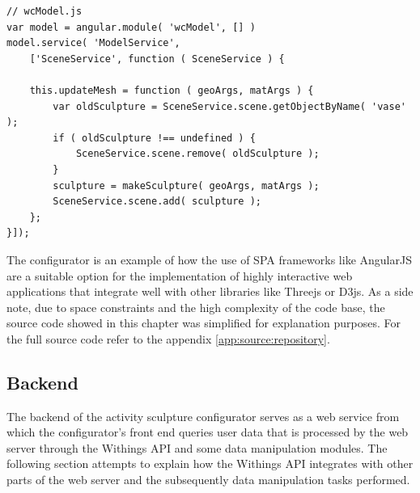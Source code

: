 \documentclass[../medieninformatik-arbeit.tex]{subfiles}
\begin{document}
\begin{lstlisting}[style=htmlcssjs, caption={Sculpture update function},label=list:ui-binding-service]
// wcModel.js
var model = angular.module( 'wcModel', [] )
model.service( 'ModelService',
	['SceneService', function ( SceneService ) {

	this.updateMesh = function ( geoArgs, matArgs ) {
	    var oldSculpture = SceneService.scene.getObjectByName( 'vase' );
	    if ( oldSculpture !== undefined ) {
	    	SceneService.scene.remove( oldSculpture );
	    }
	    sculpture = makeSculpture( geoArgs, matArgs );
	    SceneService.scene.add( sculpture );
	};
}]);
\end{lstlisting}

The configurator is an example of how the use of SPA frameworks like AngularJS are a suitable option for the implementation of highly interactive web applications that integrate well with other libraries like Threejs or D3js. As a side note, due to space constraints and the high complexity of the code base, the source code showed in this chapter was simplified for explanation purposes. For the full source code refer to the appendix \ref{app:source:repository}. 

\subsection{Backend}
The backend of the activity sculpture configurator serves as a web service from which the configurator's front end queries user data that is processed by the web server through the Withings API and some data manipulation modules. The following section attempts to explain how the Withings API integrates with other parts of the web server and the subsequently data manipulation tasks performed. 
\end{document}
